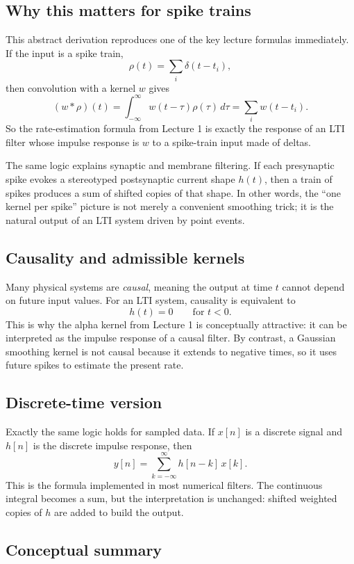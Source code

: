 \documentclass[11pt]{article}
\begin{document}
\subsection{Why this matters for spike trains}

This abstract derivation reproduces one of the key lecture formulas immediately. If the input is a spike train,
\[
\rho(t)=\sum_i \delta(t-t_i),
\]
then convolution with a kernel $w$ gives
\[
(w*\rho)(t)=\int_{-\infty}^{\infty} w(t-\tau)\rho(\tau)\,d\tau
=\sum_i w(t-t_i).
\]
So the rate-estimation formula from Lecture 1 is exactly the response of an LTI filter whose impulse response is $w$ to a spike-train input made of deltas.

The same logic explains synaptic and membrane filtering. If each presynaptic spike evokes a stereotyped postsynaptic current shape $h(t)$, then a train of spikes produces a sum of shifted copies of that shape. In other words, the ``one kernel per spike'' picture is not merely a convenient smoothing trick; it is the natural output of an LTI system driven by point events.

\subsection{Causality and admissible kernels}

Many physical systems are \emph{causal}, meaning the output at time $t$ cannot depend on future input values. For an LTI system, causality is equivalent to
\[
h(t)=0 \qquad \text{for } t<0.
\]
This is why the alpha kernel from Lecture 1 is conceptually attractive: it can be interpreted as the impulse response of a causal filter. By contrast, a Gaussian smoothing kernel is not causal because it extends to negative times, so it uses future spikes to estimate the present rate.

\subsection{Discrete-time version}

Exactly the same logic holds for sampled data. If $x[n]$ is a discrete signal and $h[n]$ is the discrete impulse response, then
\[
y[n]=\sum_{k=-\infty}^{\infty} h[n-k]\,x[k].
\]
This is the formula implemented in most numerical filters. The continuous integral becomes a sum, but the interpretation is unchanged: shifted weighted copies of $h$ are added to build the output.

\subsection{Conceptual summary}
\end{document}
